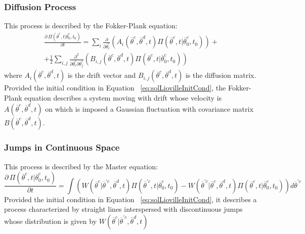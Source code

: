 \subsubsection{Diffusion Process}
\label{subsec:CKDiffusion}
This process is described by the Fokker-Plank equation:
\begin{equation}
\begin{matrix}
\frac{\partial \, \Pi \left (\overline{\theta}^{c},t|\overline{\theta}^{c}_{0},t_{0}  \right ) }{\partial t} =
\sum_{i}\frac{\partial }{\partial \overline{\theta}^{c}_{i}}\left ( A_{i}\left ( \overline{\theta}^{c},\overline{\theta}^{d},t \right ) \Pi \left (\overline{\theta}^{c},t|\overline{\theta}^{c}_{0},t_{0}  \right ) \right ) +
\\
+ \frac{1}{2}\sum_{i,j} \frac{\partial^2 }{\partial \overline{\theta}^{c}_{i} \partial \overline{\theta}^{c}_{j}}\left ( B_{i,j}\left (  \overline{\theta}^{c}, \overline{\theta}^{d}, t\right ) \Pi \left (\overline{\theta}^{c},t|\overline{\theta}_{0}^{c},t_{0}
\right )  \right )
\end{matrix}
\end{equation}
where $A_{i}\left ( \overline{\theta}^{c},\overline{\theta}^{d},t \right )$ is the drift vector and $B_{i,j}\left (  \overline{\theta}^{c}, \overline{\theta}^{d}, t\right ) $  is the diffusion matrix.
\\Provided the initial condition in Equation ~\ref{eq:solLiovilleInitCond}, the Fokker-Plank equation describes a system moving with drift whose velocity is
 $A\left ( \overline{\theta}^{c},\overline{\theta}^{d},t \right )$ on which is imposed a Gaussian fluctuation with covariance matrix $B\left (  \overline{\theta}^{c}, \overline{\theta}^{d}, t\right ) $.
%
%
%
%
\subsubsection{Jumps in Continuous Space }
\label{subsec:CKJumpsCont}
This process is described by the Master equation:
\begin{equation}
\frac{\partial \, \Pi \left (\overline{\theta}^{c},t|\overline{\theta}^{c}_{0},t_{0}  \right ) }{\partial t} =  \int \left (  W\left ( \overline{\theta}^{c}|
\overline{\theta}^{'c},\overline{\theta}^{d},t \right )\Pi \left (\overline{\theta}^{'c},t|\overline{\theta}_{0}^{c},t_{0}
\right ) - W\left ( \overline{\theta}^{'c}|
\overline{\theta}^{c},\overline{\theta}^{d},t \right )\Pi \left (\overline{\theta}^{c},t|\overline{\theta}_{0}^{c},t_{0}
\right )  \right )d\overline{\theta}^{'c}
\end{equation}
Provided the initial condition  in Equation ~\ref{eq:solLiovilleInitCond}, it describes a process characterized by
straight lines interspersed with discontinuous jumps whose distribution is given by $W\left ( \overline{\theta}^{c}|
\overline{\theta}^{'c},\overline{\theta}^{d},t \right )$

